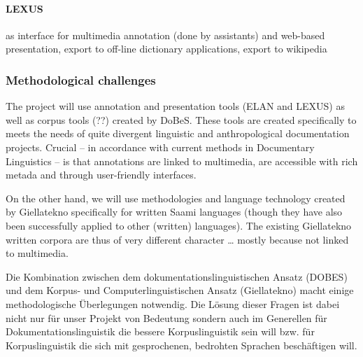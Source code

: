 \documentclass[a4paper,12pt]{article}
\begin{document}


\paragraph{LEXUS} as interface for multimedia annotation (done by assistants) and web-based presentation, export to off-line dictionary applications, export to wikipedia

\subsubsection{Methodological challenges}%
The project will use annotation and presentation tools (ELAN and LEXUS) as well as corpus tools (??) created by DoBeS. These tools are created specifically to meets the needs of quite divergent linguistic and anthropological documentation projects. Crucial – in accordance with current methods in Documentary Linguistics – is that annotations are linked to multimedia, are accessible with rich metada and through user-friendly interfaces.

On the other hand, we will use methodologies and language technology created by Giellatekno specifically for written Saami languages (though they have also been successfully applied to other (written) languages). The existing Giellatekno written corpora are thus of very different character … mostly because not linked to multimedia.

Die Kombination zwischen dem dokumentationslinguistischen Ansatz (DOBES) und dem Korpus- und Computerlinguistischen Ansatz (Giellatekno) macht einige methodologische Überlegungen notwendig. Die Lösung dieser Fragen ist dabei nicht nur für unser Projekt von Bedeutung sondern auch im Generellen für Dokumentationslinguistik die bessere Korpuslinguistik sein will bzw. für Korpuslinguistik die sich mit gesprochenen, bedrohten Sprachen beschäftigen will.
\end{document}
